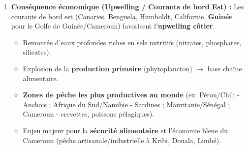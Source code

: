 \documentclass[11pt]{article}
\begin{document}
\begin{exoresolu}
\begin{enumerate}
\begin{itemize}
          \end{itemize}
    \item \textbf{Conséquence économique (Upwelling / Courants de bord Est) :}
          Les courants de bord est (Canaries, Benguela, Humboldt, Californie, \textbf{Guinée} pour le Golfe de Guinée/Cameroun) favorisent l'\textbf{upwelling côtier}.
          \begin{itemize}
              \item Remontée d'eaux profondes riches en sels nutritifs (nitrates, phosphates, silicates).
              \item Explosion de la \textbf{production primaire} (phytoplancton) $\rightarrow$ base chaîne alimentaire.
              \item \textbf{Zones de pêche les plus productives au monde} (ex: Pérou/Chili - Anchois ; Afrique du Sud/Namibie - Sardines ; Mauritanie/Sénégal ; Cameroun - crevettes, poissons pélagiques).
              \item Enjeu majeur pour la \textbf{sécurité alimentaire} et l'économie bleue du Cameroun (pêche artisanale/industrielle à Kribi, Douala, Limbé).
          \end{itemize}
\end{enumerate}
\end{exoresolu}
\end{document}
